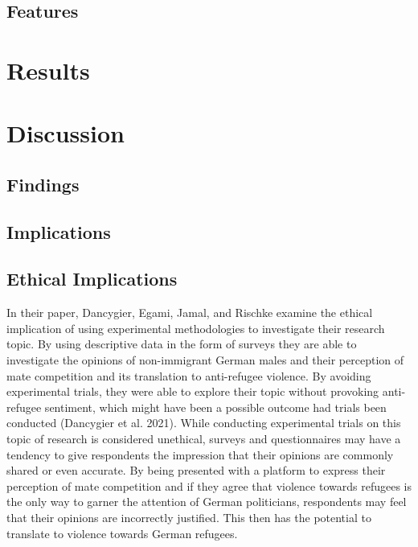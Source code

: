 \documentclass[
]{article}
\begin{document}
\hypertarget{features}{%
\subsection{Features}\label{features}}

\hypertarget{results}{%
\section{Results}\label{results}}

\hypertarget{discussion}{%
\section{Discussion}\label{discussion}}

\hypertarget{findings}{%
\subsection{Findings}\label{findings}}

\hypertarget{implications}{%
\subsection{Implications}\label{implications}}

\hypertarget{ethical-implications}{%
\subsection{Ethical Implications}\label{ethical-implications}}

In their paper, Dancygier, Egami, Jamal, and Rischke examine the ethical
implication of using experimental methodologies to investigate their
research topic. By using descriptive data in the form of surveys they
are able to investigate the opinions of non-immigrant German males and
their perception of mate competition and its translation to anti-refugee
violence. By avoiding experimental trials, they were able to explore
their topic without provoking anti-refugee sentiment, which might have
been a possible outcome had trials been conducted (Dancygier et al.
2021). While conducting experimental trials on this topic of research is
considered unethical, surveys and questionnaires may have a tendency to
give respondents the impression that their opinions are commonly shared
or even accurate. By being presented with a platform to express their
perception of mate competition and if they agree that violence towards
refugees is the only way to garner the attention of German politicians,
respondents may feel that their opinions are incorrectly justified. This
then has the potential to translate to violence towards German refugees.
\end{document}
